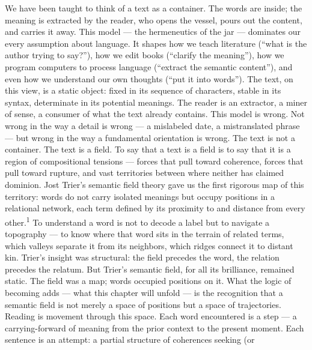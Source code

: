 We have been taught to think of a text as a container. The words are inside; the meaning is extracted by the reader, who opens the vessel, pours out the content, and carries it away. This model — the hermeneutics of the jar — dominates our every assumption about language. It shapes how we teach literature (“what is the author trying to say?”), how we edit books (“clarify the meaning”), how we program computers to process language (“extract the semantic content”), and even how we understand our own thoughts (“put it into words”). The text, on this view, is a static object: fixed in its sequence of characters, stable in its syntax, determinate in its potential meanings. The reader is an extractor, a miner of sense, a consumer of what the text already contains. This model is wrong. Not wrong in the way a detail is wrong — a mislabeled date, a mistranslated phrase — but wrong in the way a fundamental orientation is wrong. The text is not a container. The text is a field. To say that a text is a field is to say that it is a region of compositional tensions — forces that pull toward coherence, forces that pull toward rupture, and vast territories between where neither has claimed dominion. Jost Trier’s semantic field theory gave us the first rigorous map of this territory: words do not carry isolated meanings but occupy positions in a relational network, each term defined by its proximity to and distance from every other.\textsuperscript{1} To understand a word is not to decode a label but to navigate a topography — to know where that word sits in the terrain of related terms, which valleys separate it from its neighbors, which ridges connect it to distant kin. Trier’s insight was structural: the field precedes the word, the relation precedes the relatum. But Trier’s semantic field, for all its brilliance, remained static. The field was a map; words occupied positions on it. What the logic of becoming adds — what this chapter will unfold — is the recognition that a semantic field is not merely a space of positions but a space of trajectories. Reading is movement through this space. Each word encountered is a step — a carrying-forward of meaning from the prior context to the present moment. Each sentence is an attempt: a partial structure of coherences seeking (or

